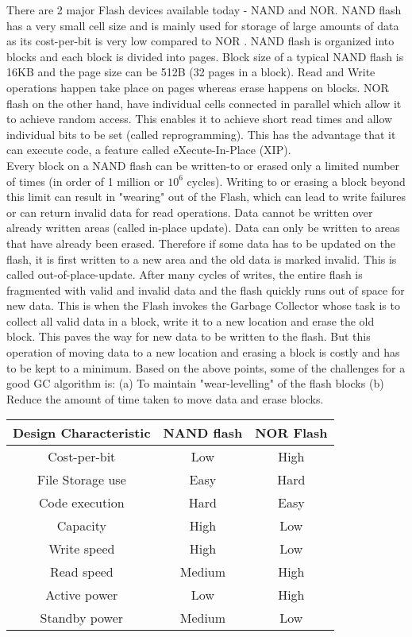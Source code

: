 There are 2 major Flash devices available today - NAND and NOR. NAND flash has a very small cell size and is mainly used for storage of large amounts of data as its cost-per-bit is very low compared to NOR \cite{Toshiba}. NAND flash is organized into blocks and each block is divided into pages. Block size of a typical NAND flash is 16KB and the page size can be 512B (32 pages in a block). Read and Write operations happen take place on pages whereas erase happens on blocks. NOR flash on the other hand, have individual cells connected in parallel which allow it to achieve random access. This enables it to achieve short read times and allow individual bits to be set (called reprogramming). This has the advantage that it can execute code, a feature called eXecute-In-Place (XIP). \\

Every block on a NAND flash can be written-to or erased only a limited number of times (in order of 1 million or $10^6$ cycles). Writing to or erasing a block beyond this limit can result in "wearing" out of the Flash, which can lead to write failures or can return invalid data for read operations. Data cannot be written over already written areas (called in-place update). Data can only be written to areas that have already been erased. Therefore if some data has to be updated on the flash, it is first written to a new area and the old data is marked invalid. This is called out-of-place-update. After many cycles of writes, the entire flash is fragmented with valid and invalid data and the flash quickly runs out of space for new data. This is when the Flash invokes the Garbage Collector whose task is to collect all valid data in a block, write it to a new location and erase the old block. This paves the way for new data to be written to the flash. But this operation of moving data to a new location and erasing a block is costly and has to be kept to a minimum. Based on the above points, some of the challenges for a good GC algorithm is: (a) To maintain "wear-levelling" of the flash blocks (b) Reduce the amount of time taken to move data and erase blocks.

\begin{center}
 \label{NANDvsNOR}
   \begin{tabular} {|  c | c | c | }
       \hline
	{\bf Design Characteristic} & {\bf NAND flash} & {\bf NOR Flash} \\ \hline
	Cost-per-bit & Low & High \\ \hline
	File Storage use & Easy & Hard \\ \hline
	Code execution & Hard & Easy\\ \hline
	Capacity & High & Low\\ \hline
	Write speed & High & Low\\ \hline
	Read speed & Medium & High\\ \hline
	Active power & Low & High\\ \hline
	Standby power & Medium & Low\\
       \hline
   \end{tabular}
\end{center}

